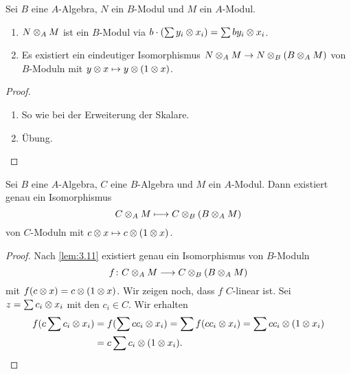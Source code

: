 \documentclass[12pt,a4paper]{scrartcl}
\theoremstyle{cplain}
\theoremstyle{cdef}
\begin{document}
\begin{lem} \label{lem:3.11}
	Sei $B$ eine $A$-Algebra, $N$ ein $B$-Modul und $M$ ein $A$-Modul.
	\begin{enumerate}
		\item $N\otimes_AM$ ist ein $B$-Modul via $b\cdot(\sum y_i\otimes x_i) = \sum by_i\otimes x_i$. \label{lem:311:i}
		\item Es existiert ein eindeutiger Isomorphismus $N\otimes_AM\to N\otimes_B(B\otimes_AM)$ von $B$-Moduln mit $y\otimes x\mapsto y\otimes (1\otimes x)$. \label{lem:311:ii}
	\end{enumerate}
\end{lem}
\begin{proof}
	\leavevmode
	\begin{enumerate}[label=\ref{lem:311:\roman*}]
		\item So wie bei der Erweiterung der Skalare.
		\item Übung. \qedhere
	\end{enumerate}
\end{proof}

\begin{satz}
	Sei $B$ eine $A$-Algebra, $C$ eine $B$-Algebra und $M$ ein $A$-Modul. Dann existiert genau ein Isomorphismus
	$$C\otimes_A M  \longmapsto  C\otimes_B(B\otimes_AM)$$
	von $C$-Moduln mit $c\otimes x\mapsto c\otimes(1\otimes x)$.
\end{satz}
\begin{proof}
	Nach \cref{lem:3.11} existiert genau ein Isomorphismus von $B$-Moduln
	\[ f\colon C\otimes_AM\longrightarrow C\otimes_B(B\otimes_AM)\]
	mit $f(c\otimes x) = c\otimes(1\otimes x)$. Wir zeigen noch, dass $f$ $C$-linear ist. Sei $z = \sum c_i\otimes x_i$ mit den $c_i\in C$. Wir erhalten
	\begin{align*}
		f(c\sum c_i\otimes x_i) &= f(\sum cc_i\otimes x_i ) = \sum f(cc_i\otimes x_i) = \sum cc_i\otimes(1\otimes x_i) \\
		&= c\sum c_i\otimes(1\otimes x_i). \qedhere
	\end{align*}
\end{proof}
\end{document}
